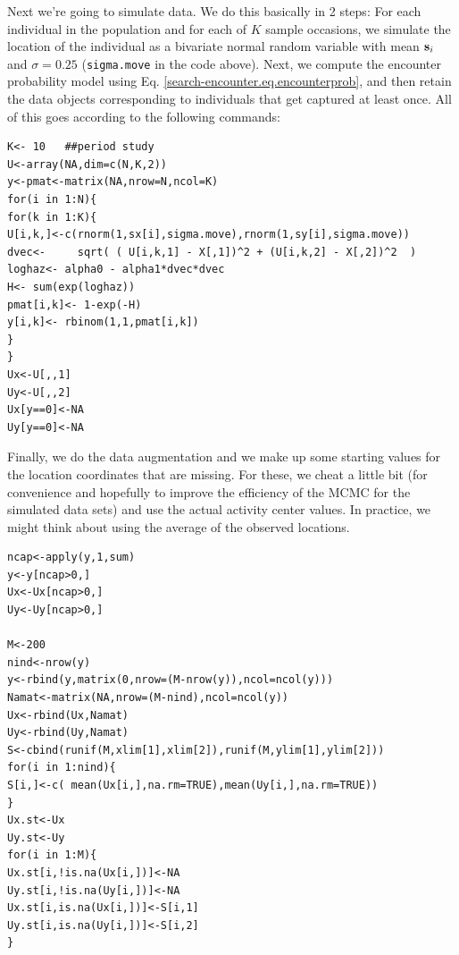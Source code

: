 Next we're going to simulate data. We do this basically in 2 steps:
For each individual in the population and for each of $K$ sample
occasions, we simulate the location of the individual as a bivariate
normal random variable with mean ${\bf s}_i$ and $\sigma = 0.25$ ({\tt sigma.move} in the code above). Next, we compute the
encounter probability model using
Eq. \ref{search-encounter.eq.encounterprob}, and then retain the
data objects corresponding to individuals that get captured at least once. All of this goes
according to the following commands:
{\small
\begin{verbatim}
K<- 10   ##period study
U<-array(NA,dim=c(N,K,2))
y<-pmat<-matrix(NA,nrow=N,ncol=K)
for(i in 1:N){
for(k in 1:K){
U[i,k,]<-c(rnorm(1,sx[i],sigma.move),rnorm(1,sy[i],sigma.move))
dvec<-     sqrt( ( U[i,k,1] - X[,1])^2 + (U[i,k,2] - X[,2])^2  )
loghaz<- alpha0 - alpha1*dvec*dvec
H<- sum(exp(loghaz))
pmat[i,k]<- 1-exp(-H)
y[i,k]<- rbinom(1,1,pmat[i,k])
}
}
Ux<-U[,,1]
Uy<-U[,,2]
Ux[y==0]<-NA
Uy[y==0]<-NA
\end{verbatim}
}


Finally, we do the data augmentation and we make up some starting
values for the location coordinates that are missing. 
 For these, we
cheat a little bit (for convenience and hopefully to improve the
efficiency of the MCMC for the simulated data sets) and use the actual
activity center values. In practice, we might think about using the
average of the observed locations.
{\small
\begin{verbatim}
ncap<-apply(y,1,sum)
y<-y[ncap>0,]
Ux<-Ux[ncap>0,]
Uy<-Uy[ncap>0,]

M<-200
nind<-nrow(y)
y<-rbind(y,matrix(0,nrow=(M-nrow(y)),ncol=ncol(y)))
Namat<-matrix(NA,nrow=(M-nind),ncol=ncol(y))
Ux<-rbind(Ux,Namat)
Uy<-rbind(Uy,Namat)
S<-cbind(runif(M,xlim[1],xlim[2]),runif(M,ylim[1],ylim[2]))
for(i in 1:nind){
S[i,]<-c( mean(Ux[i,],na.rm=TRUE),mean(Uy[i,],na.rm=TRUE))
}
Ux.st<-Ux
Uy.st<-Uy
for(i in 1:M){
Ux.st[i,!is.na(Ux[i,])]<-NA
Uy.st[i,!is.na(Uy[i,])]<-NA
Ux.st[i,is.na(Ux[i,])]<-S[i,1]
Uy.st[i,is.na(Uy[i,])]<-S[i,2]
}
\end{verbatim}
}

